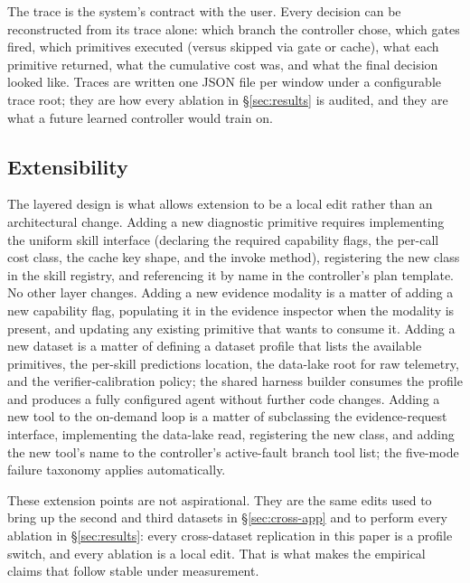 The trace is the system's contract with the user. Every decision can be reconstructed from its trace alone: which branch the controller chose, which gates fired, which primitives executed (versus skipped via gate or cache), what each primitive returned, what the cumulative cost was, and what the final decision looked like. Traces are written one JSON file per window under a configurable trace root; they are how every ablation in \S\ref{sec:results} is audited, and they are what a future learned controller would train on.

\subsection{Extensibility}
\label{sec:approach:extensibility}

The layered design is what allows extension to be a local edit rather than an architectural change. Adding a new diagnostic primitive requires implementing the uniform skill interface (declaring the required capability flags, the per-call cost class, the cache key shape, and the invoke method), registering the new class in the skill registry, and referencing it by name in the controller's plan template. No other layer changes. Adding a new evidence modality is a matter of adding a new capability flag, populating it in the evidence inspector when the modality is present, and updating any existing primitive that wants to consume it. Adding a new dataset is a matter of defining a dataset profile that lists the available primitives, the per-skill predictions location, the data-lake root for raw telemetry, and the verifier-calibration policy; the shared harness builder consumes the profile and produces a fully configured agent without further code changes. Adding a new tool to the on-demand loop is a matter of subclassing the evidence-request interface, implementing the data-lake read, registering the new class, and adding the new tool's name to the controller's active-fault branch tool list; the five-mode failure taxonomy applies automatically.

These extension points are not aspirational. They are the same edits used to bring up the second and third datasets in \S\ref{sec:cross-app} and to perform every ablation in \S\ref{sec:results}: every cross-dataset replication in this paper is a profile switch, and every ablation is a local edit. That is what makes the empirical claims that follow stable under measurement.

\FloatBarrier
